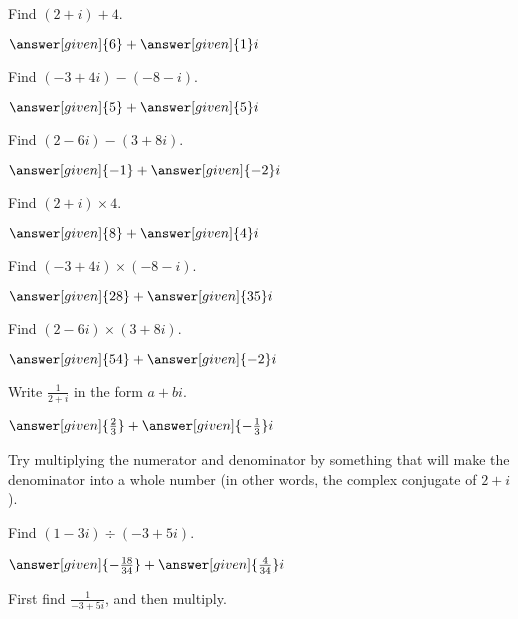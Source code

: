 \documentclass[nooutcomes]{ximera}
\begin{document}
\begin{problem}
Find $(2+i) + 4$.
\begin{prompt}
	$\answer[given]{6} + \answer[given]{1}i$
\end{prompt}
\end{problem}


\begin{problem}
Find $(-3+4i) - (-8 - i)$.
\begin{prompt}
	$\answer[given]{5} + \answer[given]{5}i$
\end{prompt}
\end{problem}


\begin{problem}
Find $(2-6i) - (3+8i)$.
\begin{prompt}
	$\answer[given]{-1} + \answer[given]{-2}i$
\end{prompt}
\end{problem}




\begin{problem}
Find $(2+i) \times 4$.
\begin{prompt}
	$\answer[given]{8} + \answer[given]{4}i$
\end{prompt}
\end{problem}



\begin{problem}
Find $(-3 + 4i) \times (-8 - i)$.
\begin{prompt}
	$\answer[given]{28} + \answer[given]{35}i$
\end{prompt}
\end{problem}




\begin{problem}
Find $(2-6i) \times (3+8i)$.
\begin{prompt}
	$\answer[given]{54} + \answer[given]{-2}i$
\end{prompt}
\end{problem}




\begin{problem}
Write $\frac{1}{2+i}$ in the form $a + bi$.
\begin{prompt}
	$\answer[given]{\frac{2}{3}} + \answer[given]{-\frac{1}{3}}i$
\end{prompt}
\begin{hint}
Try multiplying the numerator and denominator by something that will make the denominator into a whole number (in other words, the complex conjugate of $2+i$).
\end{hint}

\end{problem}



\begin{problem}
Find $(1-3i) \div (-3+5i)$.
\begin{prompt}
	$\answer[given]{-\frac{18}{34}} + \answer[given]{\frac{4}{34}}i$
\end{prompt}
\begin{hint}
First find $\frac{1}{-3+5i}$, and then multiply.
\end{hint}
\end{problem}
\end{document}
